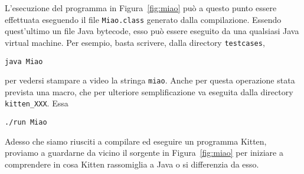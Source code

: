 L'esecuzione del programma in Figura~\ref{fig:miao} pu\`o a questo punto
essere effettuata eseguendo il file \texttt{Miao.class} generato
dalla compilazione. Essendo quest'ultimo
un file Java bytecode, esso pu\`o essere
eseguito da una qualsiasi Java virtual machine. Per esempio, basta scrivere,
dalla directory \texttt{testcases},
%
\begin{verbatim}
java Miao
\end{verbatim}
%
per vedersi stampare a video la stringa \texttt{miao}.
Anche per questa operazione \e stata prevista una macro, che per ulteriore
semplificazione va eseguita dalla directory \texttt{kitten\_XXX}. Essa \e
%
\begin{verbatim}
./run Miao
\end{verbatim}

Adesso che siamo riusciti a compilare ed eseguire un programma Kitten,
proviamo a guardarne \piu da vicino il sorgente in Figura~\ref{fig:miao} per
iniziare a comprendere in cosa Kitten rassomiglia a Java o si differenzia
da esso.

